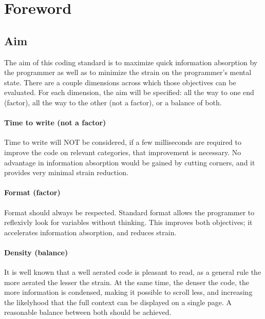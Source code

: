 \documentclass{article}
\begin{document}
\pagebreak

\section{Foreword}
\subsection{Aim}
The aim of this coding standard is to maximize quick information absorption by the programmer as well as to minimize the strain on the programmer's mental state. There are a couple dimensions across which those objectives can be evaluated. For each dimension, the aim will be specified: all the way to one end (factor), all the way to the other (not a factor), or a balance of both.

\paragraph{Time to write (not a factor)} Time to write will NOT be considered, if a few milliseconds are required to improve the code on relevant categories, that improvement is necessary. No advantage in information absorption would be gained by cutting corners, and it provides very minimal strain reduction.

\paragraph{Format (factor)} Format should always be respected. Standard format allows the programmer to reflexivly look for variables without thinking. This improves both objectives; it accelerates information absorption, and reduces strain.

\paragraph{Density (balance)} It is well known that a well aerated code is pleasant to read, as a general rule the more aerated the lesser the strain. At the same time, the denser the code, the more information is condensed, making it possible to scroll less, and increasing the likelyhood that the full context can be displayed on a single page. A reasonable balance between both should be achieved.
\end{document}
